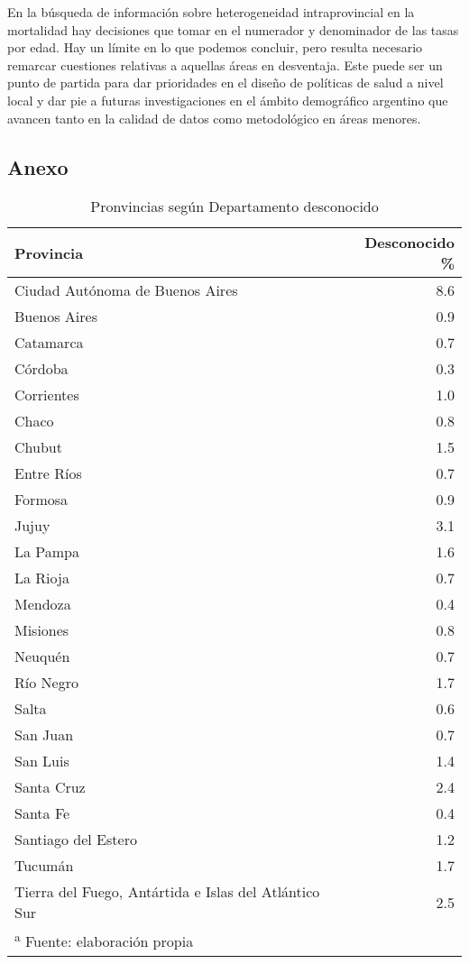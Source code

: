 \documentclass[12pt,]{article}
\begin{document}
En la búsqueda de información sobre heterogeneidad intraprovincial en la
mortalidad hay decisiones que tomar en el numerador y denominador de las
tasas por edad. Hay un límite en lo que podemos concluir, pero resulta
necesario remarcar cuestiones relativas a aquellas áreas en desventaja.
Este puede ser un punto de partida para dar prioridades en el diseño de
políticas de salud a nivel local y dar pie a futuras investigaciones en
el ámbito demográfico argentino que avancen tanto en la calidad de datos
como metodológico en áreas menores.

\hypertarget{anexo}{%
\subsection{Anexo}\label{anexo}}

\begin{table}

\caption{\label{tab:SinDEP}Pronvincias según Departamento desconocido}
\centering
\begin{tabular}[t]{l|r}
\hline
Provincia & Desconocido \%\\
\hline
Ciudad Autónoma de Buenos Aires & 8.6\\
\hline
Buenos Aires & 0.9\\
\hline
Catamarca & 0.7\\
\hline
Córdoba & 0.3\\
\hline
Corrientes & 1.0\\
\hline
Chaco & 0.8\\
\hline
Chubut & 1.5\\
\hline
Entre Ríos & 0.7\\
\hline
Formosa & 0.9\\
\hline
Jujuy & 3.1\\
\hline
La Pampa & 1.6\\
\hline
La Rioja & 0.7\\
\hline
Mendoza & 0.4\\
\hline
Misiones & 0.8\\
\hline
Neuquén & 0.7\\
\hline
Río Negro & 1.7\\
\hline
Salta & 0.6\\
\hline
San Juan & 0.7\\
\hline
San Luis & 1.4\\
\hline
Santa Cruz & 2.4\\
\hline
Santa Fe & 0.4\\
\hline
Santiago del Estero & 1.2\\
\hline
Tucumán & 1.7\\
\hline
Tierra del Fuego, Antártida e Islas del Atlántico Sur & 2.5\\
\hline
\multicolumn{2}{l}{\textsuperscript{a} Fuente: elaboración propia}\\
\end{tabular}
\end{table}
\end{document}
